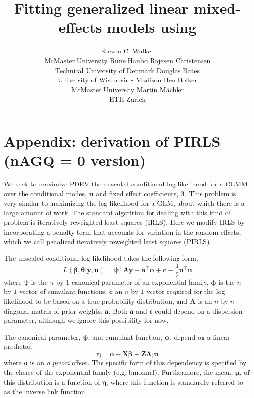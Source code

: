 \documentclass{jss}
\author{
  Steven C. Walker\\McMaster University \And
  Rune Haubo Bojesen Christensen\\Technical University of Denmark\AND
  Douglas Bates\\University of Wisconsin - Madison \And
  Ben Bolker\\McMaster University \AND
  Martin M\"achler\\ETH Zurich
}
\title{Fitting generalized linear \bmb{and nonlinear?} mixed-effects models using \pkg{lme4}}
\begin{document}

\section{Appendix: derivation of PIRLS (nAGQ = 0 version)}

We seek to maximize PDEV the unscaled conditional log-likelihood 
for a GLMM over the conditional modes, $\bm u$ and fixed effect
coefficients, $\bm\beta$. This problem is very similar to maximizing
the log-likelihood for a GLM, about which there is a large amount of
work. The standard algorithm for dealing with this kind of problem is
iteratively reweighted least squares (IRLS). Here we modify IRLS by
incorporating a penalty term that accounts for variation in the random
effects, which we call penalized iteratively reweighted least squares (PIRLS). 

The unscaled conditional log-likelihood takes the following form,
\begin{equation}
L(\bm\beta, \bm\theta | \bm y, \bm u) = 
\bm\psi^\top \bm A \bm y - 
\bm a^\top \bm \phi  + 
\bm c -
\frac{1}{2}\bm u^\top \bm u
\end{equation}
where $\bm\psi$ is the $n$-by-$1$ canonical parameter of an exponential family,
$\bm\phi$ is the $n$-by-$1$ vector of cumulant functions, $\bm c$ an
$n$-by-$1$ vector required for the log-likelihood to be based on a
true probability distribution, and $\bm A$ is an $n$-by-$n$ diagonal
matrix of prior weights, $\bm a$. Both $\bm a$ and $\bm c$ could depend on a dispersion
parameter, although we ignore this possibility for now.

The canonical parameter, $\bm\psi$, and cumulant function, $\bm\phi$,
depend on a linear predictor,
\begin{equation}
\bm\eta = \bm o + \bm X \bm\beta + \bm Z \bm\Lambda_\theta \bm u
\end{equation}
where $\bm o$ is an \emph{a priori} offset. The specific form of this
dependency is specified by the choice of the exponential family
(e.g. binomial). Furthermore, the mean, $\bm\mu$, of this distribution
is a function of $\bm\eta$, where this function is standardly referred
to as the inverse link function.
\end{document}

